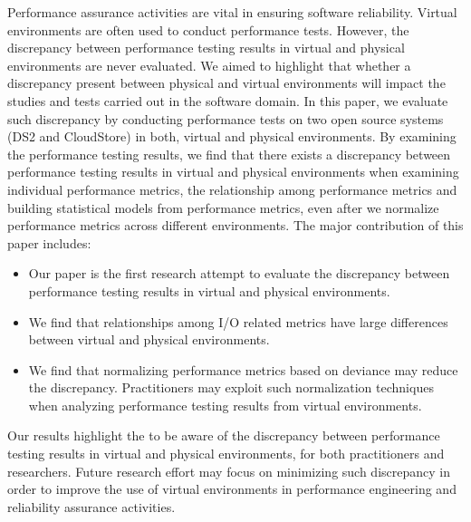 Performance assurance activities are vital in ensuring software reliability. Virtual environments are often used to conduct performance tests. However, the discrepancy between performance testing results in virtual and physical environments are never evaluated. We aimed to highlight that whether a discrepancy present between physical and virtual environments will impact the studies and tests carried out in the software domain. In this paper, we evaluate such discrepancy by conducting performance tests on two open source systems (DS2 and CloudStore) in both, virtual and physical environments. By examining the performance testing results, we find that there exists a discrepancy between performance testing results in virtual and physical environments when examining individual performance metrics, the relationship among performance metrics and building statistical models from performance metrics, even after we normalize performance metrics across different environments. The major contribution of this paper includes: 
\begin{itemize} \itemsep -0.4pt 
	\item Our paper is the first research attempt to evaluate the discrepancy between performance testing results in virtual and physical environments.
	\item We find that relationships among I/O related metrics have large differences between virtual and physical environments.
	\item We find that normalizing performance metrics based on deviance may reduce the discrepancy. Practitioners may exploit such normalization techniques when analyzing performance testing results from virtual environments.
\end{itemize}
Our results highlight the to be aware of the discrepancy between performance testing results in virtual and physical environments, for both practitioners and researchers. Future research effort may focus on minimizing such discrepancy in order to improve the use of virtual environments in performance engineering and reliability assurance activities.



